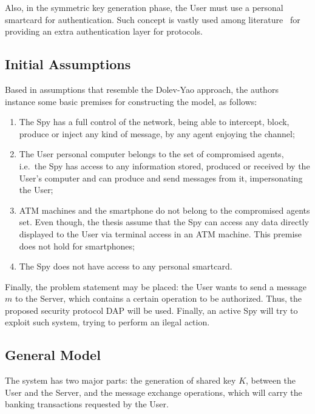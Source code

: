 Also, in the symmetric key generation phase, the User must use a personal smartcard for authentication. Such concept is vastly used among literature~\cite{ShoupRubin96} for providing an extra authentication layer for protocols.



\subsection{Initial Assumptions}
Based in assumptions that resemble the Dolev-Yao approach, the authors instance some basic premises for constructing the model, as follows:

\begin{enumerate}
  \item The Spy has a full control of the network, being able to intercept, block, produce or inject any kind of message, by any agent enjoying the channel;

  \item The User personal computer belongs to the set of compromised agents, i.e.\ the Spy has access to any information stored, produced or received by the User's computer and can produce and send messages from it, impersonating the User;

  \item ATM machines and the smartphone do not belong to the compromised agents set. Even though, the thesis assume that the Spy can access any data directly displayed to the User via terminal access in an ATM machine. This premise does not hold for smartphones;

  \item The Spy does not have access to any personal smartcard.
\end{enumerate}

Finally, the problem statement may be placed: the User wants to send a message \(m\) to the Server, which contains a certain operation to be authorized. Thus, the proposed security protocol DAP will be used. Finally, an active Spy will try to exploit such system, trying to perform an ilegal action.



\subsection{General Model}
The system has two major parts: the generation of shared key \(K\), between the User and the Server, and the message exchange operations, which will carry the banking transactions requested by the User.

